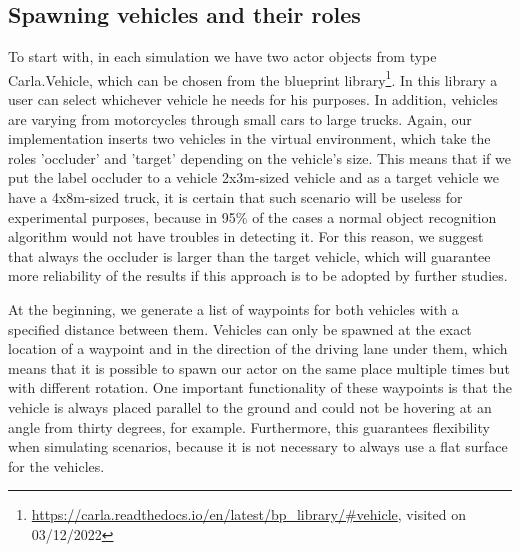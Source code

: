 \subsection{Spawning vehicles and their roles}
To start with, in each simulation we have two actor objects from type Carla.Vehicle, which can be chosen from the blueprint library\footnote{\url{https://carla.readthedocs.io/en/latest/bp_library/\#vehicle}, visited on 03/12/2022}. In this library a user can select whichever vehicle he needs for his purposes. In addition, vehicles are varying from motorcycles through small cars to large trucks. Again, our implementation inserts two vehicles in the virtual environment, which take the roles 'occluder' and 'target' depending on the vehicle's size. This means that if we put the label occluder to a vehicle 2x3m-sized vehicle and as a target vehicle we have a 4x8m-sized truck, it is certain that such scenario will be useless for experimental purposes, because in 95\% of the cases a normal object recognition algorithm would not have troubles in detecting it. For this reason, we suggest that always the occluder is larger than the target vehicle, which will guarantee more reliability of the results if this approach is to be adopted by further studies.

At the beginning, we generate a list of waypoints for both vehicles with a specified distance between them. Vehicles can only be spawned at the exact location of a waypoint and in the direction of the driving lane under them, which means that it is possible to spawn our actor on the same place multiple times but with different rotation. One important functionality of these waypoints is that the vehicle is always placed parallel to the ground and could not be hovering at an angle from thirty degrees, for example. Furthermore, this guarantees flexibility when simulating scenarios, because it is not necessary to always use a flat surface for the vehicles. 

